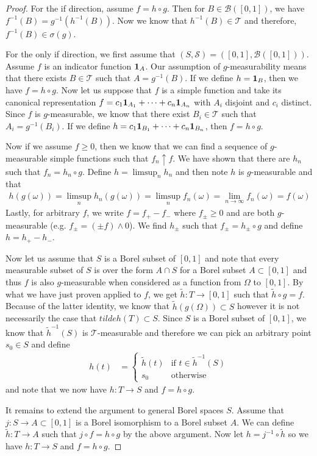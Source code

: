 \begin{proof}
For the if direction, assume $f = h \circ g$.  Then for $B \in
\mathcal{B}([0,1])$, we have $f^{-1}(B) = g^{-1}(h^{-1}(B))$.  Now we know
that $h^{-1}(B) \in \mathcal{T}$ and therefore, $f^{-1}(B) \in
\sigma(g)$.

For the only if direction, we first assume that $(S, \mathcal{S})
=([0,1], \mathcal{B}([0,1]))$.  
Assume $f$ is an indicator
function $\textbf{1}_{A}$.  Our assumption of $g$-measurability
means that there exists $B \in \mathcal{T}$ such that $A =
g^{-1}(B)$.  If we define $h = \textbf{1}_{B}$, then we have $f =
h \circ g$.  Now let us suppose that $f$ is a simple function and take
its canonical representation $f = c_1 \textbf{1}_{A_1} + \cdots + c_n
\textbf{1}_{A_n}$ with $A_i$ disjoint and $c_i$ distinct.  Since $f$ is
$g$-measurable, we know that there exist $B_i \in \mathcal{T}$ such
that $A_i = g^{-1}(B_i)$.  If we define $h=c_1 \textbf{1}_{B_1} + \cdots + c_n
\textbf{1}_{B_n}$, then $f = h \circ g$.

Now if we assume $f \geq 0$, then we know that we can find a sequence
of $g$-measurable simple functions such that $f_n \uparrow f$.  We
have shown that there are $h_n$ such that $f_n = h_n \circ g$.  Define
$h = \limsup_n h_n$ and then note $h$ is $g$-measurable and that 
\begin{align*}
h(g(\omega)) = \limsup_n h_n(g(\omega)) = \limsup_n f_n(\omega) =
\lim_{n \to \infty} f_n(\omega) = f(\omega)
\end{align*}
Lastly, for arbitrary $f$, we write $f = f_+ - f_{-}$ where $f_{\pm}
\geq 0$ and are both $g$-measurable (e.g. $f_{\pm} = (\pm f) \wedge 0$).
We find $h_{\pm}$ such that $f_{\pm} = h_{\pm} \circ g$ and define $h
= h_+ - h_{-}$.

Now let us assume that $S$ is a Borel subset of $[0,1]$ and note that
every measurable subset of $S$ is over the form $A \cap S$ for a Borel
subset $A \subset [0,1]$ and thus $f$ is also
$g$-measurable when considered as a function from $\Omega$ to $[0,1]$.  
By what we have just proven applied to
$f$, we get $\tilde{h} : T \to [0,1]$ such that $\tilde{h}
\circ g = f$.  Because of the latter identity, we know that
$\tilde{h}(g(\Omega)) \subset S$ however it is not necessarily the
case that $tilde{h}(T) \subset S$.  Since $S$ is a Borel subset of
$[0,1]$, we know that $\tilde{h}^{-1}(S)$ is $\mathcal{T}$-measurable
and therefore we can pick an arbitrary point $s_0 \in S$ and define
\begin{align*}
h(t) &= \begin{cases}
\tilde{h}(t) & \text{if $t \in \tilde{h}^{-1}(S)$} \\
s_0 & \text{otherwise}
\end{cases}
\end{align*}
and note that we now have $h : T \to S$ and $f = h \circ g$.

It remains to extend the argument to general Borel spaces $S$.  Assume
that $j : S \to A \subset [0,1]$ is a Borel isomorphism to a Borel
subset $A$.  We can define $\tilde{h}: T \to A$ such that $j \circ f =
h \circ g$ by the above argument.  Now let $h = j^{-1} \circ
\tilde{h}$ so we have $h : T \to S$ and $f = h \circ g$.
\end{proof}
